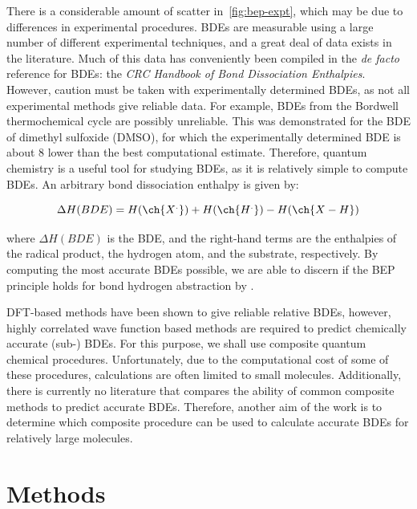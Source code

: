 There is a considerable amount of scatter in~\ref{fig:bep-expt}, which may be due to differences in experimental procedures. BDEs are measurable using a large number of different experimental techniques, and a great deal of data exists in the literature. Much of this data has conveniently been compiled in the \emph{de facto} reference for BDEs: the \emph{CRC Handbook of Bond Dissociation Enthalpies}.\cite{Luo2002} However, caution must be taken with experimentally determined BDEs, as not all experimental methods give reliable data. For example, BDEs from the Bordwell\cite{Bordwell1988} thermochemical cycle are possibly unreliable.\cite{Salamone2012, Miller2016} This was demonstrated for the BDE of dimethyl sulfoxide (DMSO), for which the experimentally determined BDE is about 8 \kcalmol lower than the best computational estimate.\cite{Salamone2012} Therefore, quantum chemistry is a useful tool for studying BDEs, as it is relatively simple to compute BDEs. An arbitrary  bond dissociation enthalpy is given by:

\begin{equation}
  \Delta H(BDE) =  H(\ch{X^.}) + H(\ch{H^.}) - H(\ch{X-H})
\end{equation}

\noindent where $\Delta H(BDE)$ is the BDE, and the right-hand terms are the enthalpies of the radical product, the hydrogen atom, and the substrate, respectively. By computing the most accurate BDEs possible, we are able to discern if the BEP principle holds for  bond hydrogen abstraction by \cumo.

DFT-based methods have been shown to give reliable relative BDEs, however, highly correlated wave function based methods are required to predict chemically accurate (sub-\kcalmol) BDEs.\cite{DiLabio1999, Chan2012, Wiberg2014} For this purpose, we shall use composite quantum chemical procedures. Unfortunately, due to the computational cost of some of these procedures, calculations are often limited to small molecules. Additionally, there is currently no literature that compares the ability of common composite methods to predict accurate BDEs. Therefore, another aim of the work is to determine which composite procedure can be used to calculate accurate BDEs for relatively large molecules.

\section{Methods}

